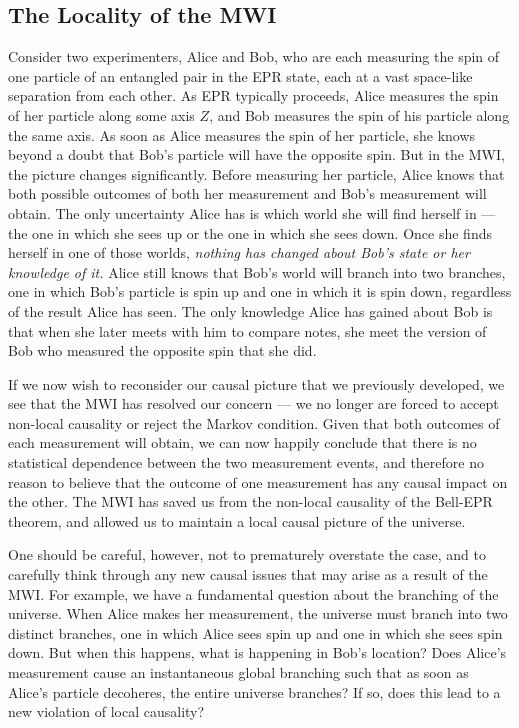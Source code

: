 \subsection{The Locality of the MWI}

Consider two experimenters, Alice and Bob, who are each measuring the spin of
one particle of an entangled pair in the EPR state, each at a vast space-like
separation from each other. As EPR typically proceeds, Alice measures the spin
of her particle along some axis $Z$, and Bob measures the spin of his particle
along the same axis. As soon as Alice measures the spin of her particle, she
knows beyond a doubt that Bob's particle will have the opposite spin. But in the
MWI, the picture changes significantly. Before measuring her particle, Alice
knows that both possible outcomes of both her measurement and Bob's measurement
will obtain. The only uncertainty Alice has is which world she will find herself
in — the one in which she sees up or the one in which she sees down. Once she 
finds herself in one of those worlds, \emph{nothing has changed about Bob's
state or her knowledge of it.} Alice still knows that Bob's world will branch 
into two branches, one in which Bob's particle is spin up and one in which it is
spin down, regardless of the result Alice has seen. The only knowledge Alice has
gained about Bob is that when she later meets with him to compare notes, she
meet the version of Bob who measured the opposite spin that she did. 

If we now wish to reconsider our causal picture that we previously developed, we
see that the MWI has resolved our concern — we no longer are forced to accept
non-local causality or reject the Markov condition. Given that both outcomes of
each measurement will obtain, we can now happily conclude that there is no 
statistical dependence between the two measurement events, and therefore no
reason to believe that the outcome of one measurement has any causal impact on
the other. The MWI has saved us from the non-local causality of the Bell-EPR
theorem, and allowed us to maintain a local causal picture of the universe.

One should be careful, however, not to prematurely overstate the case, and to
carefully think through any new causal issues that may arise as a result of
the MWI. For example, we have a fundamental question about the branching of the 
universe. When Alice makes her measurement, the universe must branch into two
distinct branches, one in which Alice sees spin up and one in which she sees
spin down. But when this happens, what is happening in Bob's location? Does 
Alice's measurement cause an instantaneous global branching such that as soon as
Alice's particle decoheres, the entire universe branches? If so, does this lead
to a new violation of local causality?

